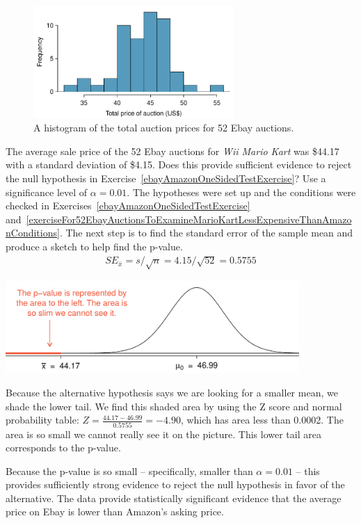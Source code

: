 \begin{figure}
   \centering
   \includegraphics[width=0.68\textwidth]{ch_inference_foundations/figures/ebayMarioKartAuctionPriceHistogramFor3ConditionsExercise/ebayMarioKartAuctionPriceHistogramFor3ConditionsExercise}
   \caption{A histogram of the total auction prices for 52 Ebay auctions.}
   \label{ebayMarioKartAuctionPriceHistogramFor3ConditionsExercise}
\end{figure}

\begin{example}{The average sale price of the 52 Ebay auctions for \emph{Wii Mario Kart} was \$44.17 with a standard deviation of \$4.15. Does this provide sufficient evidence to reject the null hypothesis in Exercise~\ref{ebayAmazonOneSidedTestExercise}? Use a significance level of $\alpha = 0.01$.}
The hypotheses were set up and the conditions were checked in Exercises~\ref{ebayAmazonOneSidedTestExercise} and~\ref{exerciseFor52EbayAuctionsToExamineMarioKartLessExpensiveThanAmazonConditions}. The next step is to find the standard error of the sample mean and produce a sketch to help find the p-value.
\begin{eqnarray*}
SE_{\bar{x}} = s/\sqrt{n} = 4.15/\sqrt{52} = 0.5755
\end{eqnarray*}
\begin{center}
\includegraphics[height=35mm]{ch_inference_foundations/figures/pVForEbayAmazonComparison/pVForEbayAmazonComparison}
\end{center}
Because the alternative hypothesis says we are looking for a smaller mean, we shade the lower tail. We find this shaded area by using the Z score and normal probability table: $Z = \frac{44.17 - 46.99}{0.5755} = -4.90$, which has area less than 0.0002. The area is so small we cannot really see it on the picture. This lower tail area corresponds to the p-value.

Because the p-value is so small -- specifically, smaller than $\alpha = 0.01$ -- this provides sufficiently strong evidence to reject the null hypothesis in favor of the alternative. The data provide statistically significant evidence that the average price on Ebay is lower than Amazon's asking price.
\end{example}

